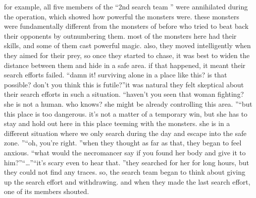  for example, all five members of the “2nd search team ” were annihilated during the operation, which showed how powerful the monsters were.
these monsters were fundamentally different from the monsters of before who tried to beat back their opponents by outnumbering them.
 most of the monsters here had their skills, and some of them cast powerful magic.
also, they moved intelligently when they aimed for their prey, so once they started to chase, it was best to widen the distance between them and hide in a safe area.
if that happened, it meant their search efforts failed.
“damn it! surviving alone in a place like this? is that possible? don’t you think this is futile?”it was natural they felt skeptical about their search efforts in such a situation.
“haven’t you seen that woman fighting? she is not a human.
 who knows? she might be already controlling this area.
”“but this place is too dangerous.
 it’s not a matter of a temporary win, but she has to stay and hold out here in this place teeming with the monsters.
 she is in a different situation where we only search during the day and escape into the safe zone.
”“oh, you’re right.
”when they thought as far as that, they began to feel anxious.
“what would the necromancer say if you found her body and give it to him?”“…”“it’s scary even to hear that.
”they searched for her for long hours, but they could not find any traces.
so, the search team began to think about giving up the search effort and withdrawing.
and when they made the last search effort, one of its members shouted.

